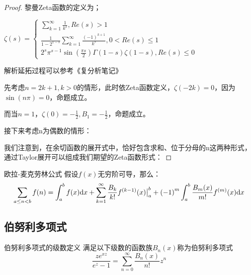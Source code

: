 \documentclass[12pt, a4paper, oneside, UTF8]{ctexbook}
\begin{document}
\begin{para}{0}
\begin{para}{1}
					\begin{proof}
						黎曼Zeta函数的定义为；
						
						$\zeta(s)=\begin{cases}
							\sum\limits_{k=1}^{\infty}\frac{1}{k^s},Re(s)>1 \\
							\frac{1}{1-2^{1-s}}\sum\limits_{k=1}^{\infty}\frac{(-1)^{k+1}}{k^s},0< Re(s) \leqslant 1 \\
							2^s \pi^{s-1} \sin\left(\frac{\pi s}{2}\right)\Gamma(1-s)\zeta(1-s),Re(s)\leqslant 0
						\end{cases}$
						
						解析延拓过程可以参考《复分析笔记》
						
						先考虑$n=2k+1,k>0$的情形，此时依Zeta函数定义，$\zeta(-2k)=0$，因为$\sin(n\pi)=0$，命题成立。
						
						而当$n=1$，$\zeta(0)=-\frac{1}{2},B_1=-\frac{1}{2}$，命题成立。
						
						接下来考虑n为偶数的情形：
						
						我们注意到，在余切函数的展开式中，恰好包含求和、位于分母的n这两种形式，通过Taylor展开可以组成我们期望的Zeta函数形式：
						
						
					\end{proof}
				\end{para}
			\begin{them}{欧拉-麦克劳林公式}{}
				假设$f(x)$无穷阶可导，那么：
				\begin{equation}
					\sum\limits_{a\leq n<b}f(n) = \int_{a}^{b}f(x)\mathrm{d} x+\sum\limits_{k=1}^{\infty}\frac{B_k}{k!}f^{(k-1)}(x)\big|_{a}^{b}+{(-1)}^{m}\int_{a}^{b}\frac{B_m({x})}{m!}f^{(m)}(x)\mathrm{d} x
				\end{equation}
				
			\end{them}
		\end{para}
		\subsection{伯努利多项式}
		\begin{para}{0}
			\begin{defn}{伯努利多项式的级数定义}{}
				满足以下级数的函数族$B_n(x)$称为伯努利多项式
				\begin{equation}
					\frac{z e^{xz}}{e^z-1}=\sum\limits_{n=0}^{\infty} \frac{B_n(x)}{n!}z^n
				\end{equation}
			\end{defn}
		\end{para}
	
\end{document}
